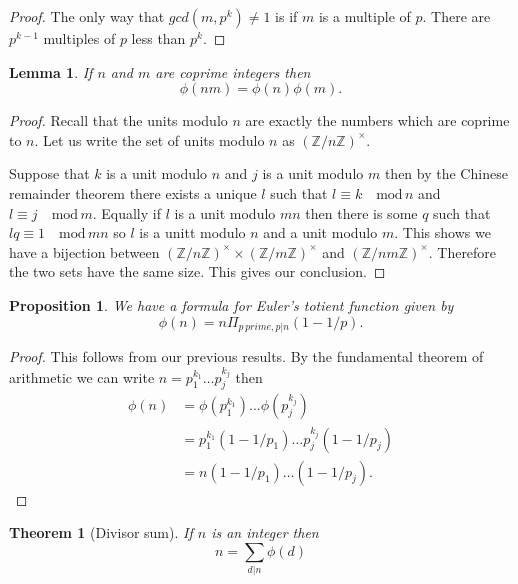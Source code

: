 \documentclass[
]{book}
\newtheorem{theorem}{Theorem}[chapter]
\newtheorem{lemma}{Lemma}[chapter]
\newtheorem{proposition}{Proposition}[chapter]
\theoremstyle{definition}
\theoremstyle{definition}
\theoremstyle{definition}
\theoremstyle{definition}
\theoremstyle{remark}
\begin{document}
\begin{proof}
The only way that \(gcd(m,p^k) \neq 1\) is if \(m\) is a multiple of \(p\). There are \(p^{k-1}\) multiples of \(p\) less than \(p^k\).
\end{proof}

\begin{lemma}
If \(n\) and \(m\) are coprime integers then
\[ \phi(nm) = \phi(n)\phi(m). \]
\end{lemma}

\begin{proof}
Recall that the units modulo \(n\) are exactly the numbers which are coprime to \(n\). Let us write the set of units modulo \(n\) as \(\left(\mathbb{Z}/n \mathbb{Z} \right)^{\times}\).

Suppose that \(k\) is a unit modulo \(n\) and \(j\) is a unit modulo \(m\) then by the Chinese remainder theorem there exists a unique \(l\) such that \(l \equiv k \quad \mbox{mod} \, n\) and \(l \equiv j \quad \mbox{mod} \, m\). Equally if \(l\) is a unit modulo \(mn\) then there is some \(q\) such that \(lq \equiv 1 \quad \mbox{mod}\, mn\) so \(l\) is a unitt modulo \(n\) and a unit modulo \(m\). This shows we have a bijection between \(\left(\mathbb{Z}/n \mathbb{Z} \right)^{\times} \times \left(\mathbb{Z}/m \mathbb{Z} \right)^{\times}\) and \(\left(\mathbb{Z}/nm \mathbb{Z} \right)^{\times}\). Therefore the two sets have the same size. This gives our conclusion.
\end{proof}

\begin{proposition}
We have a formula for Euler's totient function given by
\[ \phi(n) = n \Pi_{p \, prime, p|n} (1-1/p).  \]
\end{proposition}

\begin{proof}
This follows from our previous results. By the fundamental theorem of arithmetic we can write \(n = p_1^{k_1} \dots p_j^{k_j}\) then
\begin{align*} \phi(n) &= \phi(p_1^{k_1}) \dots \phi(p_j^{k_j})  \\
& = p_1^{k_1}(1-1/p_1) \dots p_j^{k_j}(1-1/p_j) \\
& = n (1-1/p_1) \dots (1-1/p_j).
\end{align*}
\end{proof}

\begin{theorem}[Divisor sum]
If \(n\) is an integer then
\[ n = \sum_{d|n} \phi(d)  \]
\end{theorem}
\end{document}
